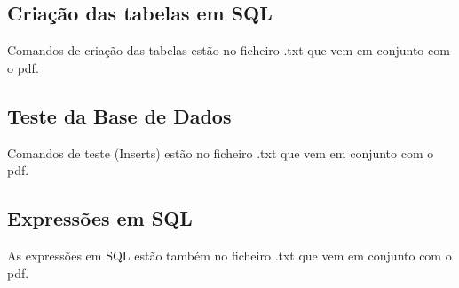 \documentclass[a4paper]{article}
\begin{document}
\newpage
\subsection{Criação das tabelas em SQL}
Comandos de criação das tabelas estão no ficheiro .txt que vem em conjunto com o pdf.

\subsection{Teste da Base de Dados}
Comandos de teste (Inserts) estão no ficheiro .txt que vem em conjunto com o pdf.

\subsection{Expressões em SQL}
As expressões em SQL estão também no ficheiro .txt que vem em conjunto com o pdf.
\end{document}
